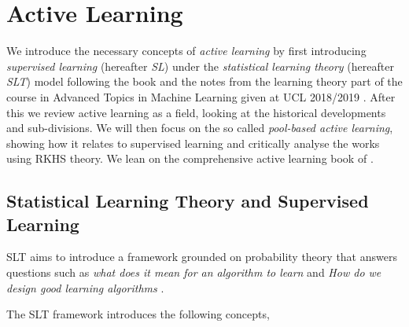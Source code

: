 \section{Active Learning} We introduce the necessary concepts of \textit{active learning}
by first introducing \textit{supervised learning} (hereafter \emph{SL}) under the
\textit{statistical learning theory} (hereafter \emph{SLT}) model following the book
\citep{shalev-shwartz14_under} and the notes from the learning theory part of the
course in Advanced Topics in Machine Learning given at UCL 2018/2019
\citep{ciliberto18_advan_topic_machin_learn}. After this we review active
learning as a field, looking at the historical developments and sub-divisions.
We will then focus on the so called \emph{pool-based active learning}, showing
how it relates to supervised learning and critically analyse the works using
RKHS theory. We lean on the comprehensive active learning book of
\citep{settles12_activ_learn}.

\subsection{Statistical Learning Theory and Supervised Learning} SLT aims to
introduce a framework grounded on probability theory that answers questions such as
 \emph{what does it mean for an algorithm to learn} and \emph{How do we design
   good learning algorithms} \citep[Lecture 1]{ciliberto18_advan_topic_machin_learn}.

The SLT framework introduces the following concepts,

